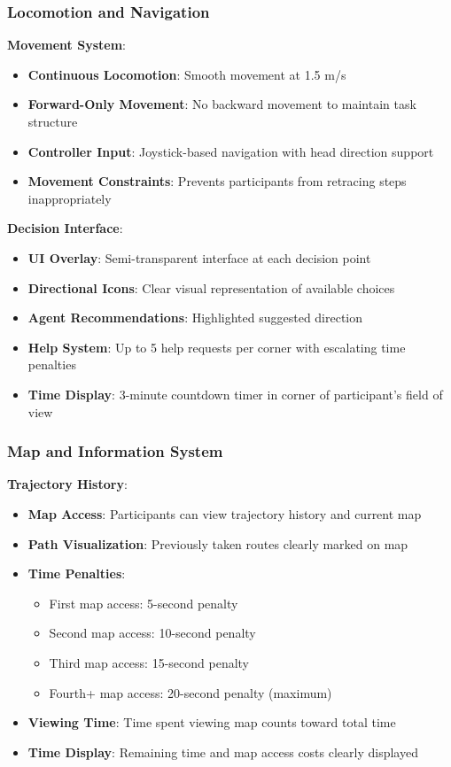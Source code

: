 \documentclass[12pt]{article}
\begin{document}
\subsubsection{Locomotion and Navigation}

\textbf{Movement System}:
\begin{itemize}
    \item \textbf{Continuous Locomotion}: Smooth movement at 1.5 m/s
    \item \textbf{Forward-Only Movement}: No backward movement to maintain task structure
    \item \textbf{Controller Input}: Joystick-based navigation with head direction support
    \item \textbf{Movement Constraints}: Prevents participants from retracing steps inappropriately
\end{itemize}

\textbf{Decision Interface}:
\begin{itemize}
    \item \textbf{UI Overlay}: Semi-transparent interface at each decision point
    \item \textbf{Directional Icons}: Clear visual representation of available choices
    \item \textbf{Agent Recommendations}: Highlighted suggested direction
    \item \textbf{Help System}: Up to 5 help requests per corner with escalating time penalties
    \item \textbf{Time Display}: 3-minute countdown timer in corner of participant's field of view
\end{itemize}

\subsubsection{Map and Information System}

\textbf{Trajectory History}:
\begin{itemize}
    \item \textbf{Map Access}: Participants can view trajectory history and current map
    \item \textbf{Path Visualization}: Previously taken routes clearly marked on map
    \item \textbf{Time Penalties}: 
    \begin{itemize}
        \item First map access: 5-second penalty
        \item Second map access: 10-second penalty
        \item Third map access: 15-second penalty
        \item Fourth+ map access: 20-second penalty (maximum)
    \end{itemize}
    \item \textbf{Viewing Time}: Time spent viewing map counts toward total time
    \item \textbf{Time Display}: Remaining time and map access costs clearly displayed
\end{itemize}
\end{document}
